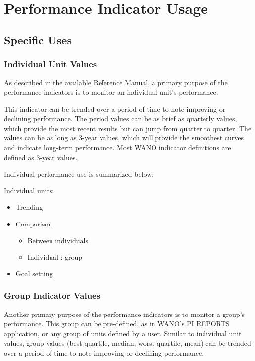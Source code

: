 \section{Performance Indicator Usage}
\subsection{Specific Uses}
\subsubsection{Individual Unit Values }

As described in the available Reference Manual, a primary purpose of the performance
indicators is to monitor an individual unit’s performance.

This indicator can be trended over a period of time to note improving
or declining performance.  The period values can be as brief as
quarterly values, which provide the most recent results but can jump from
quarter to quarter.  The values can be as long as 3-year values, which will provide the
smoothest curves and indicate long-term  performance.  Most WANO indicator
definitions are defined as 3-year values.

Individual performance use is summarized below:

Individual units:
\begin{itemize}
\item Trending
\item Comparison
  \begin{itemize}
  \item Between individuals
  \item Individual : group
  \end{itemize}
\item Goal setting
\end{itemize}

\subsubsection{Group Indicator Values }

Another primary purpose of the performance indicators is to monitor a group’s
performance.  This group can be pre-defined, as in WANO’s PI REPORTS application,
or any group of units defined by a user.  Similar to individual unit values, group values
(best quartile, median, worst quartile, mean) can be trended over a period of time to note
improving or declining performance.

